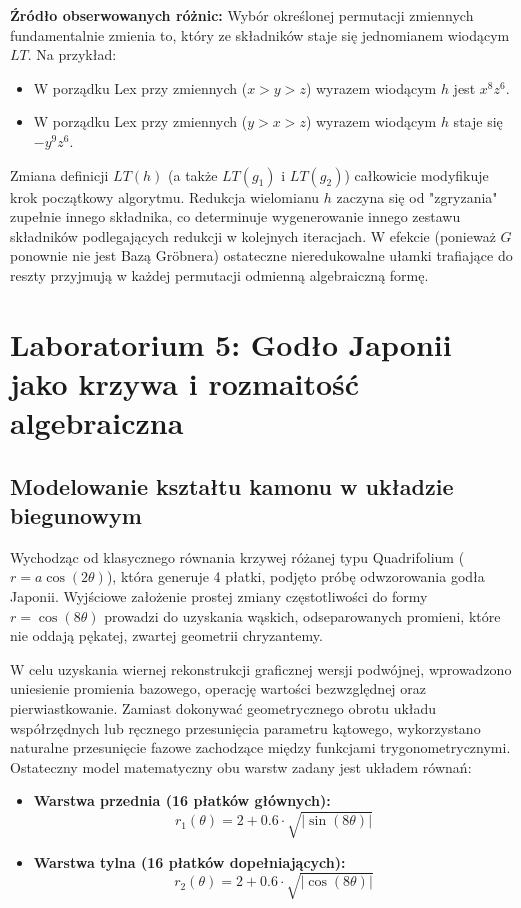 \documentclass[a4paper,11pt]{article}
\begin{document}
\textbf{Źródło obserwowanych różnic:}
Wybór określonej permutacji zmiennych fundamentalnie zmienia to, który ze składników staje się jednomianem wiodącym $LT$. Na przykład:
\begin{itemize}
    \item W porządku Lex przy zmiennych ($x > y > z$) wyrazem wiodącym $h$ jest $x^8 z^6$.
    \item W porządku Lex przy zmiennych ($y > x > z$) wyrazem wiodącym $h$ staje się $-y^9 z^6$.
\end{itemize}
Zmiana definicji $LT(h)$ (a także $LT(g_1)$ i $LT(g_2)$) całkowicie modyfikuje krok początkowy algorytmu. Redukcja wielomianu $h$ zaczyna się od "zgryzania" zupełnie innego składnika, co determinuje wygenerowanie innego zestawu składników podlegających redukcji w kolejnych iteracjach. W efekcie (ponieważ $G$ ponownie nie jest Bazą Gröbnera) ostateczne nieredukowalne ułamki trafiające do reszty przyjmują w każdej permutacji odmienną algebraiczną formę.


\section{Laboratorium 5: Godło Japonii jako krzywa i rozmaitość algebraiczna}

\subsection{Modelowanie kształtu kamonu w układzie biegunowym}
Wychodząc od klasycznego równania krzywej różanej typu Quadrifolium ($r = a\cos(2\theta)$), która generuje 4 płatki, podjęto próbę odwzorowania godła Japonii. Wyjściowe założenie prostej zmiany częstotliwości do formy $r = \cos(8\theta)$ prowadzi do uzyskania wąskich, odseparowanych promieni, które nie oddają pękatej, zwartej geometrii chryzantemy.

W celu uzyskania wiernej rekonstrukcji graficznej wersji podwójnej, wprowadzono uniesienie promienia bazowego, operację wartości bezwzględnej oraz pierwiastkowanie. Zamiast dokonywać geometrycznego obrotu układu współrzędnych lub ręcznego przesunięcia parametru kątowego, wykorzystano naturalne przesunięcie fazowe zachodzące między funkcjami trygonometrycznymi. Ostateczny model matematyczny obu warstw zadany jest układem równań:

\begin{itemize}
    \item \textbf{Warstwa przednia (16 płatków głównych):}
    \[ r_1(\theta) = 2 + 0.6 \cdot \sqrt{|\sin(8\theta)|} \]
    \item \textbf{Warstwa tylna (16 płatków dopełniających):}
    \[ r_2(\theta) = 2 + 0.6 \cdot \sqrt{|\cos(8\theta)|} \]
\end{itemize}
\end{document}
